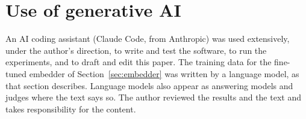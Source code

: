 \documentclass[11pt]{article}
\begin{document}
\section*{Use of generative AI}

An AI coding assistant (Claude Code, from Anthropic) was used
extensively, under the author's direction, to write and test the
software, to run the experiments, and to draft and edit this paper. The training data for the fine-tuned
embedder of Section~\ref{sec:embedder} was written by a language
model, as that section describes.
Language models also appear as answering models and judges where the
text says so. The author reviewed the results and the text and takes
responsibility for the content.



\end{document}
